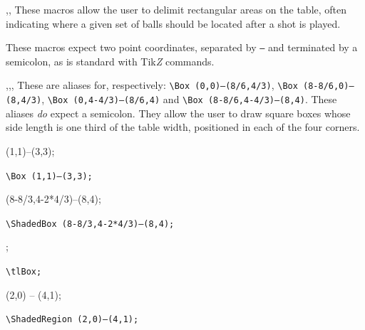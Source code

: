 \documentclass[11pt,a4paper]{ltxdoc}
\def\bluett#1{{\color{blue}\texttt{#1}}}
\begin{document}
\begin{macro}{\Box,\ShadedRegion,\ShadedBox}
    These macros allow the user to delimit rectangular areas on the table, often indicating where a given set of balls should be located after a shot is played.

    These macros expect two point coordinates, separated by \texttt{--} and terminated by a semicolon, as is standard with Tik\textit{Z} commands.
\end{macro}

\begin{macro}{\blBox,\brBox,\tlBox,\trBox}
    These are aliases for, respectively: \texttt{\textbackslash Box (0,0)--(8/6,4/3)}, \texttt{\textbackslash Box (8-8/6,0)--(8,4/3)}, \texttt{\textbackslash Box (0,4-4/3)--(8/6,4)} and \texttt{\textbackslash Box (8-8/6,4-4/3)--(8,4)}. These aliases \textit{do} expect a semicolon. They allow the user to draw square boxes whose side length is one third of the table width, positioned in each of the four corners.\medskip

    \begin{minipage}{.5\linewidth}
    \centering
        \begin{bTable}[scale=.75]
            \Box (1,1)--(3,3);
        \end{bTable}\par
        \bluett{\textbackslash Box (1,1)--(3,3);}
    \end{minipage}
    \begin{minipage}{.5\linewidth}
    \centering
        \begin{bTable}[scale=.75]
            \ShadedBox (8-8/3,4-2*4/3)--(8,4);
        \end{bTable}\par
        \bluett{\textbackslash ShadedBox (8-8/3,4-2*4/3)--(8,4);}
    \end{minipage}

    \begin{minipage}{.5\linewidth}
    \centering
        \begin{bTable}[scale=.75]
            \tlBox;
        \end{bTable}\par
        \bluett{\textbackslash tlBox;}
    \end{minipage}
    \begin{minipage}{.5\linewidth}
    \centering
        \begin{bTable}[scale=.75]
            \ShadedRegion (2,0) -- (4,1);
        \end{bTable}\par
        \bluett{\textbackslash ShadedRegion (2,0)--(4,1);}
    \end{minipage}\medskip


\end{macro}
\end{document}
